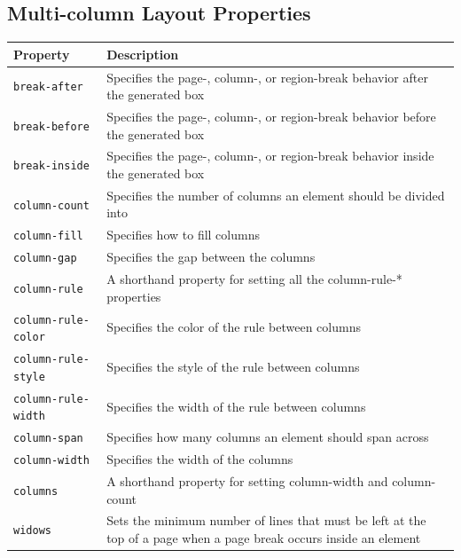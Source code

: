 \documentclass[11pt, letterpaper]{article}
\begin{document}
		\subsection{Multi-column Layout Properties}
			\begin{longtable}{p{5cm} p{10cm}}
				\toprule
				Property & Description \\\midrule 
				\texttt{break-after} & Specifies the page-, column-, or region-break behavior after the generated box \\\midrule
				\texttt{break-before} & Specifies the page-, column-, or region-break behavior before the generated box \\\midrule
				\texttt{break-inside} & Specifies the page-, column-, or region-break behavior inside the generated box \\\midrule
				\texttt{column-count} & Specifies the number of columns an element should be divided into \\\midrule
				\texttt{column-fill} & Specifies how to fill columns \\\midrule
				\texttt{column-gap} & Specifies the gap between the columns \\\midrule
				\texttt{column-rule} & A shorthand property for setting all the column-rule-* properties \\\midrule
				\texttt{column-rule-color} & Specifies the color of the rule between columns \\\midrule
				\texttt{column-rule-style} & Specifies the style of the rule between columns \\\midrule
				\texttt{column-rule-width} & Specifies the width of the rule between columns \\\midrule
				\texttt{column-span} & Specifies how many columns an element should span across \\\midrule
				\texttt{column-width} & Specifies the width of the columns \\\midrule
				\texttt{columns} & A shorthand property for setting column-width and column-count \\\midrule
				\texttt{widows} & Sets the minimum number of lines that must be left at the top of a page when a page break occurs inside an element \\\midrule
			\end{longtable}
\end{document}
